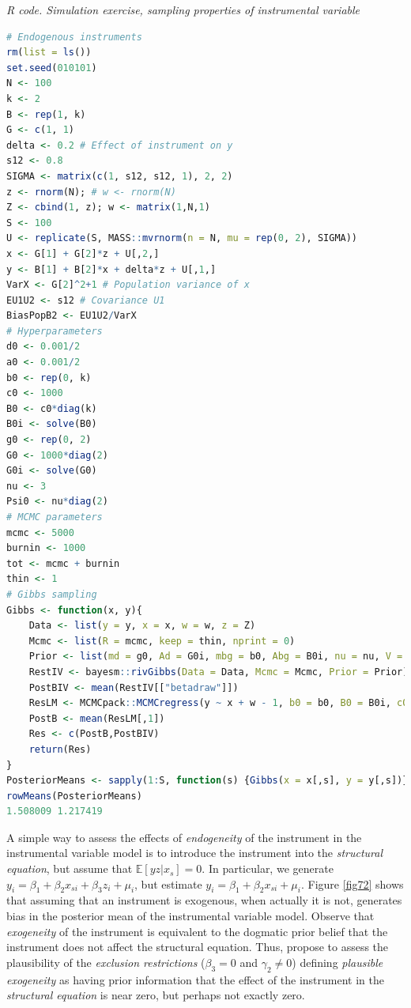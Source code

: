 \begin{enumerate}[leftmargin=*]
\begin{tcolorbox}[enhanced,width=4.67in,center upper,
	fontupper=\large\bfseries,drop shadow southwest,sharp corners]
	\textit{R code. Simulation exercise, sampling properties of instrumental variable}
	\begin{VF}
		\begin{lstlisting}[language=R]
# Endogenous instruments
rm(list = ls())
set.seed(010101)
N <- 100
k <- 2
B <- rep(1, k)
G <- c(1, 1)
delta <- 0.2 # Effect of instrument on y
s12 <- 0.8
SIGMA <- matrix(c(1, s12, s12, 1), 2, 2)
z <- rnorm(N); # w <- rnorm(N)
Z <- cbind(1, z); w <- matrix(1,N,1)
S <- 100
U <- replicate(S, MASS::mvrnorm(n = N, mu = rep(0, 2), SIGMA))
x <- G[1] + G[2]*z + U[,2,]
y <- B[1] + B[2]*x + delta*z + U[,1,]
VarX <- G[2]^2+1 # Population variance of x
EU1U2 <- s12 # Covariance U1
BiasPopB2 <- EU1U2/VarX
# Hyperparameters
d0 <- 0.001/2
a0 <- 0.001/2
b0 <- rep(0, k)
c0 <- 1000
B0 <- c0*diag(k)
B0i <- solve(B0)
g0 <- rep(0, 2)
G0 <- 1000*diag(2)
G0i <- solve(G0)
nu <- 3
Psi0 <- nu*diag(2)
# MCMC parameters
mcmc <- 5000
burnin <- 1000
tot <- mcmc + burnin
thin <- 1
# Gibbs sampling
Gibbs <- function(x, y){
	Data <- list(y = y, x = x, w = w, z = Z)
	Mcmc <- list(R = mcmc, keep = thin, nprint = 0)
	Prior <- list(md = g0, Ad = G0i, mbg = b0, Abg = B0i, nu = nu, V = Psi0)
	RestIV <- bayesm::rivGibbs(Data = Data, Mcmc = Mcmc, Prior = Prior)
	PostBIV <- mean(RestIV[["betadraw"]])
	ResLM <- MCMCpack::MCMCregress(y ~ x + w - 1, b0 = b0, B0 = B0i, c0 = a0, d0 = d0)
	PostB <- mean(ResLM[,1])
	Res <- c(PostB,PostBIV)
	return(Res)
}
PosteriorMeans <- sapply(1:S, function(s) {Gibbs(x = x[,s], y = y[,s])})
rowMeans(PosteriorMeans)
1.508009 1.217419
\end{lstlisting}
	\end{VF}
\end{tcolorbox} 

A simple way to assess the effects of \textit{endogeneity} of the instrument in the instrumental variable model is to introduce the instrument into the \textit{structural equation}, but assume that $\mathbb{E}[yz|x_s]=0$. In particular, we generate $y_i=\beta_1+\beta_2 x_{si} + \beta_3 z_i + \mu_i$, but estimate $y_i=\beta_1+\beta_2 x_{si} + \mu_i$. Figure \ref{fig72} shows that assuming that an instrument is exogenous, when actually it is not, generates bias in the posterior mean of the instrumental variable model. Observe that \textit{exogeneity} of the instrument is equivalent to the dogmatic prior belief that the instrument does not affect the structural equation. Thus, \cite{Conley2012} propose to assess the plausibility of the \textit{exclusion restrictions} ($\beta_3=0$ and $\gamma_2\neq 0$) defining \textit{plausible exogeneity} as having prior information that the effect of the instrument in the \textit{structural equation} is near zero, but perhaps not exactly zero.  


\end{enumerate}
